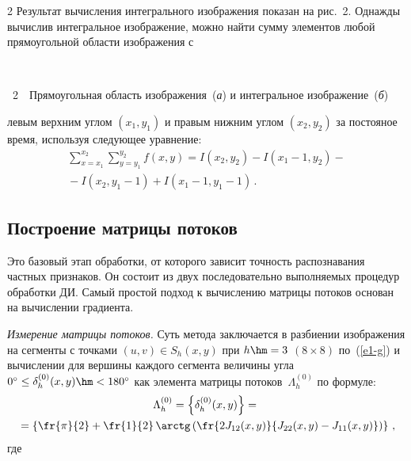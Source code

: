 \begin{multicols}{2}
  Результат вычисления интегрального изображения показан на рис.~2. 
Однажды вычислив интегральное изображение, можно найти сумму элементов 
любой прямоугольной области изображения с\linebreak\vspace*{-12pt}
\begin{center} %
\vspace*{4pt}
\mbox{%
 \epsfxsize=70.657mm
}
\end{center}
\vspace*{3pt}
{{\figurename~2}\ \ \small{Прямоугольная область изображения~(\textit{а}) и интегральное изображение~(\textit{б})}}
\vspace*{8pt}

\addtocounter{figure}{1}

\noindent
 левым верхним углом $(x_1, y_1)$ 
и правым нижним углом $(x_2, y_2)$ за постояное время, используя следующее 
уравнение:
  \begin{multline}
  \sum\limits_{x=x_1}^{x_2}\sum\limits_{y=y_1}^{y_2} f(x,y)=I(x_2,y_2)-I(x_1-
1,y_2)-{}\\
{}-I(x_2,y_1-1)+I(x_1-1,y_1-1)\,.
  \label{e7-g}
  \end{multline}



\subsection{Построение матрицы потоков} %
  
  Это базовый этап обработки, от которого зависит точность распознавания 
частных признаков. Он состоит из двух последовательно выполняемых 
процедур обработки ДИ. Самый простой подход к вы\-чис\-ле\-нию матрицы 
потоков основан на вы\-чис\-ле\-нии градиента.
  
  \textit{Измерение матрицы потоков.} Суть метода заключается в разбиении 
изображения на сегменты с точками $(u,v)\in S_h(x,y)$ при $h\hm=3$ $(8\times 8)$ 
по~(\ref{e1-g}) и вычислении для вершины каждого сегмента величины угла 
$0^\circ\leq \delta_h^{(0)}(x,y)\hm<180^\circ$ как элемента матрицы 
потоков~$\Lambda_h^{(0)}$ по формуле:
  \begin{multline*}
  \Lambda_h^{(0)} =\left\{ \delta_h^{(0)}(x,y)\right\} ={}\\
  {}= \left\{ 
\fr{\pi}{2}+\fr{1}{2}\,\arctg \left( \fr{2J_{12}(x,y)}{J_{22}(x,y)-
J_{11}(x,y)}\right)\right\}\,,
  \end{multline*}
где 


\end{multicols}
